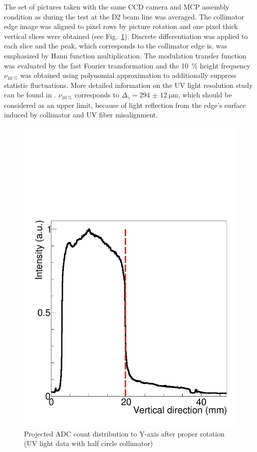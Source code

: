 \documentclass[preprint,3p,twocolumn]{elsarticle}
\begin{document}
The set of pictures taken with the same CCD camera and MCP assembly condition as during the test at the D2 beam line was averaged.
The collimator edge image was aligned to pixel rows by picture rotation and 
one pixel thick vertical slices were obtained (see Fig.~\ref{fig:half_circle}).
Discrete differentiation was applied to each slice  and the peak,
which corresponds to the collimator edge is,
was emphasized by Hann function multiplication.
The modulation transfer function was evaluated by the fast Fourier transformation and
the \SI{10}{\percent} height frequency $\nu_{\SI{10}{\percent}}$ was obtained using polynomial approximation to additionally suppress statistic fluctuations.
More detailed information on the UV light resolution study can be found in \cite{Gosha}.
$\nu_{\SI{10}{\percent}}$ corresponds to $\Delta_\gamma = \SI{294(12)}{\um}$,
which should be considered as an upper limit,
because of light reflection from the edge's surface induced by collimator and UV fiber misalignment.
\begin{figure}[tb]
	\begin{minipage}[t]{60mm}
		\includegraphics[width=1.3\textwidth, height=1.\textwidth]{figure/edge_image_w_uv_4_BH_axis.pdf}
	\end{minipage}
	\caption{ Projected ADC count distribution to Y-axis after proper rotation (UV light data with half circle collimator)}
	\label{fig:half_circle}
\end{figure}
\end{document}
